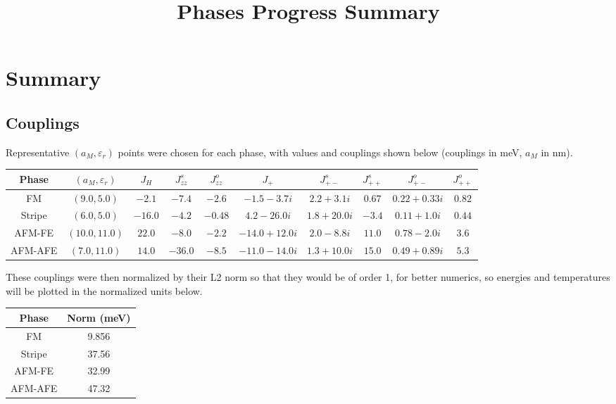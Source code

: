 \documentclass{article}
\title{Phases Progress Summary}
\begin{document}
\section{Summary}
\subsection{Couplings}
Representative $(a_M, \varepsilon_r)$ points were chosen for each phase, with values
and couplings shown below (couplings in meV, $a_M$ in nm).
\begin{center}
\begin{tabular}{|c|c|c|c|c|c|c|c|c|c|}
    \hline
    Phase & $(a_M,\varepsilon_r)$ & $J_H$ & $J_{zz}^s$ & $J_{zz}^o$ & $J_+$ & $J_{+-}^s$ & $J_{++}^s$ & $J_{+-}^o$ & $J_{++}^o$\\
    \hline
    FM & $(9.0,5.0)$ & $-2.1$ & $-7.4$ & $-2.6$ & $-1.5 - 3.7i$ & $2.2 + 3.1i$ & $0.67$ & $0.22 + 0.33i$ & $0.82$\\
    \hline
    Stripe & $(6.0,5.0)$ & $-16.0$ & $-4.2$ & $-0.48$ & $4.2 - 26.0i$ & $1.8 + 20.0i$ & $-3.4$ & $0.11 + 1.0i$ & $0.44$\\
    \hline
    AFM-FE & $(10.0,11.0)$ & $22.0$ & $-8.0$ & $-2.2$ & $-14.0 + 12.0i$ & $2.0 - 8.8i$ & $11.0$ & $0.78 - 2.0i$ & $3.6$\\
    \hline
    AFM-AFE & $(7.0,11.0)$ & $14.0$ & $-36.0$ & $-8.5$ & $-11.0 - 14.0i$ & $1.3 + 10.0i$ & $15.0$ & $0.49 + 0.89i$ & $5.3$\\
    \hline
\end{tabular}
\end{center}
These couplings were then normalized by their L2 norm so that they would be of order 1, for better numerics,
so energies and temperatures will be plotted in the normalized units below.
\begin{center}
\begin{tabular}{|c|c|}
    \hline
    Phase & Norm (meV)\\
    \hline
    FM & 9.856\\
    \hline
    Stripe & 37.56\\
    \hline
    AFM-FE & 32.99\\
    \hline
    AFM-AFE & 47.32\\
    \hline
\end{tabular}
\end{center}
\end{document}
